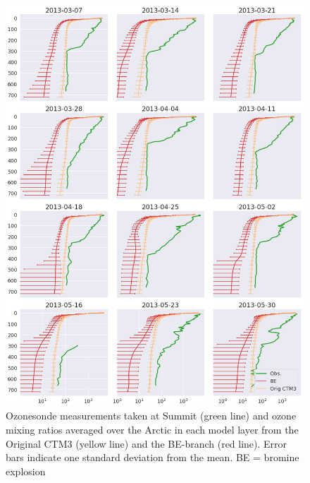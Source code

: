 \begin{figure}[h]
    \centering
    \includegraphics[width = \linewidth]{Chapter6_Results/images/ozone_stationComp_2013/OZONOSONDE_2013.png}
    \caption{Ozonesonde measurements taken at Summit (green line) and ozone mixing ratios averaged over the Arctic in each model layer from the Original CTM3 (yellow line) and the BE-branch (red line). Error bars indicate one standard deviation from the mean. BE = bromine explosion}
    \label{fig:ozonosonde2013}
\end{figure}